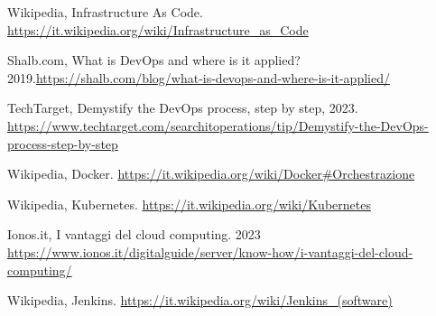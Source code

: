 \documentclass[a4paper,12pt]{report}
\begin{document}
%
%
\begin{thebibliography}{00}
%
Wikipedia, Infrastructure As Code. \url{https://it.wikipedia.org/wiki/Infrastructure_as_Code}

Shalb.com, What is DevOps and where is it applied? 2019.\url{https://shalb.com/blog/what-is-devops-and-where-is-it-applied/}

TechTarget, Demystify the DevOps process, step by step, 2023. \url{https://www.techtarget.com/searchitoperations/tip/Demystify-the-DevOps-process-step-by-step}

Wikipedia, Docker. \url{https://it.wikipedia.org/wiki/Docker#Orchestrazione}

Wikipedia, Kubernetes. \url{https://it.wikipedia.org/wiki/Kubernetes}

Ionos.it, I vantaggi del cloud computing. 2023 \url{https://www.ionos.it/digitalguide/server/know-how/i-vantaggi-del-cloud-computing/}

Wikipedia, Jenkins. \url{https://it.wikipedia.org/wiki/Jenkins_(software)}
%
%
\end{thebibliography}
% 
\end{document}
